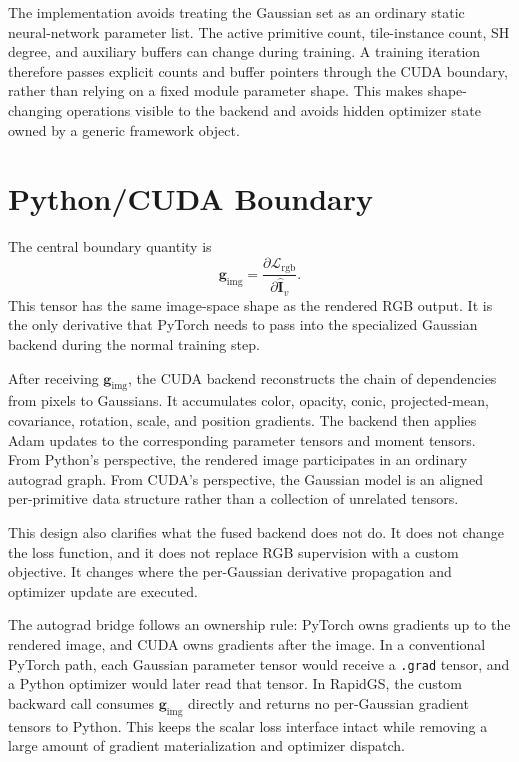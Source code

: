 The implementation avoids treating the Gaussian set as an ordinary static neural-network parameter list. The active primitive count, tile-instance count, SH degree, and auxiliary buffers can change during training. A training iteration therefore passes explicit counts and buffer pointers through the CUDA boundary, rather than relying on a fixed module parameter shape. This makes shape-changing operations visible to the backend and avoids hidden optimizer state owned by a generic framework object.

\section{Python/CUDA Boundary}

The central boundary quantity is
\begin{equation}
\mathbf{g}_{\mathrm{img}}
=
\frac{\partial \mathcal{L}_{\mathrm{rgb}}}
{\partial \hat{\mathbf{I}}_v}.
\end{equation}
This tensor has the same image-space shape as the rendered RGB output. It is the only derivative that PyTorch needs to pass into the specialized Gaussian backend during the normal training step.

After receiving $\mathbf{g}_{\mathrm{img}}$, the CUDA backend reconstructs the chain of dependencies from pixels to Gaussians. It accumulates color, opacity, conic, projected-mean, covariance, rotation, scale, and position gradients. The backend then applies Adam updates to the corresponding parameter tensors and moment tensors. From Python's perspective, the rendered image participates in an ordinary autograd graph. From CUDA's perspective, the Gaussian model is an aligned per-primitive data structure rather than a collection of unrelated tensors.

This design also clarifies what the fused backend does not do. It does not change the loss function, and it does not replace RGB supervision with a custom objective. It changes where the per-Gaussian derivative propagation and optimizer update are executed.

The autograd bridge follows an ownership rule: PyTorch owns gradients up to the rendered image, and CUDA owns gradients after the image. In a conventional PyTorch path, each Gaussian parameter tensor would receive a \texttt{.grad} tensor, and a Python optimizer would later read that tensor. In RapidGS, the custom backward call consumes $\mathbf{g}_{\mathrm{img}}$ directly and returns no per-Gaussian gradient tensors to Python. This keeps the scalar loss interface intact while removing a large amount of gradient materialization and optimizer dispatch.

